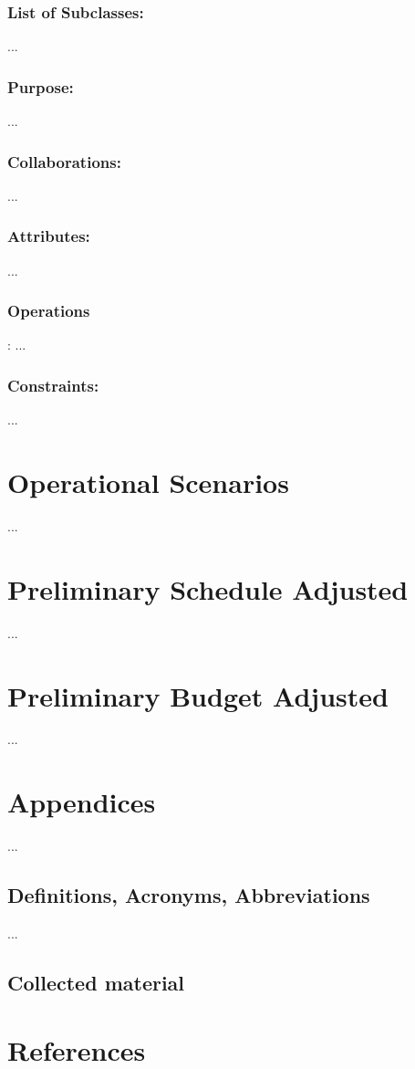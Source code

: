 \documentclass[]{article}
\begin{document}
\subsubsection {List of Subclasses:} 
... 
\subsubsection {Purpose: }
... 
\subsubsection {Collaborations: }
... 
\subsubsection {Attributes: }
... 
\subsubsection {Operations}: 
... 
\subsubsection {Constraints:} 
... 

\section{Operational Scenarios}
... 

\section{Preliminary Schedule Adjusted}
... 
\section{Preliminary Budget Adjusted}
... 
\section{Appendices}
... 
\subsection{Definitions, Acronyms, Abbreviations}
... 
\subsection{Collected material}

\section {References}



\end{document}
